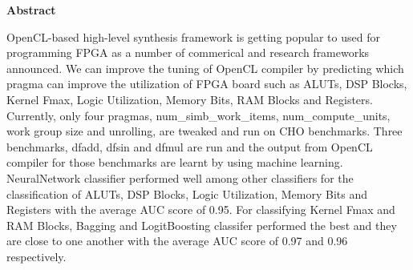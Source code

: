 
\thispagestyle{plain}
\begin{center}
    \textbf{Abstract}
\end{center}
OpenCL-based high-level synthesis framework is getting popular to used for programming FPGA as a number of commerical and research frameworks announced. We can improve the tuning of OpenCL compiler by predicting which pragma can improve the utilization of FPGA board such as ALUTs, DSP Blocks, Kernel Fmax, Logic Utilization, Memory Bits, RAM Blocks and Registers. Currently, only four pragmas, num\_simb\_work\_items, num\_compute\_units, work group size and unrolling, are tweaked and run on CHO benchmarks. Three benchmarks, dfadd, dfsin and dfmul are run and the output from OpenCL compiler for those benchmarks are learnt by using machine learning. NeuralNetwork classifier performed well among other classifiers for the classification of ALUTs, DSP Blocks, Logic Utilization, Memory Bits and Registers with the average AUC score of 0.95. For classifying Kernel Fmax and RAM Blocks, Bagging and LogitBoosting classifer performed the best and they are close to one another with the average AUC score of 0.97 and 0.96 respectively.

\newpage